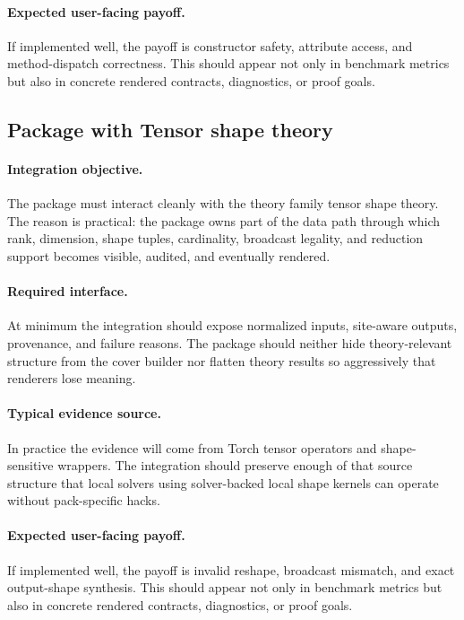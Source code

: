 \documentclass[11pt]{report}
\DeclareRobustCommand{\py}[1]{\texttt{\detokenize{#1}}}
\theoremstyle{definition}
\theoremstyle{plain}
\begin{document}
\paragraph{Expected user-facing payoff.}
If implemented well, the payoff is constructor safety, attribute access, and method-dispatch correctness. This should appear not only
in benchmark metrics but also in concrete rendered contracts,
diagnostics, or proof goals.


\subsection{Package \py{src/deppy/assist} with Tensor shape theory}

\paragraph{Integration objective.}
The package \py{src/deppy/assist} must interact cleanly with the
theory family tensor shape theory. The reason is practical: the
package owns part of the data path through which rank, dimension, shape tuples, cardinality, broadcast legality, and reduction support becomes
visible, audited, and eventually rendered.

\paragraph{Required interface.}
At minimum the integration should expose normalized inputs, site-aware
outputs, provenance, and failure reasons. The package should neither hide
theory-relevant structure from the cover builder nor flatten theory
results so aggressively that renderers lose meaning.

\paragraph{Typical evidence source.}
In practice the evidence will come from Torch tensor operators and shape-sensitive wrappers. The integration should
preserve enough of that source structure that local solvers using solver-backed local shape kernels
can operate without pack-specific hacks.

\paragraph{Expected user-facing payoff.}
If implemented well, the payoff is invalid reshape, broadcast mismatch, and exact output-shape synthesis. This should appear not only
in benchmark metrics but also in concrete rendered contracts,
diagnostics, or proof goals.
\end{document}
